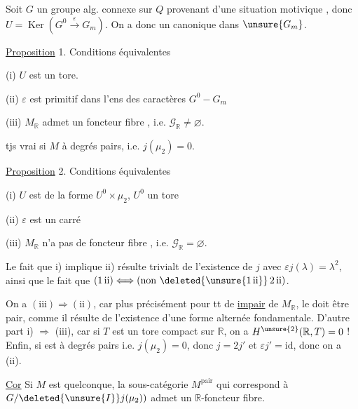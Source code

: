 Soit $G$ un groupe  alg. connexe sur $Q$ provenant d'une situation motivique , donc $U=\operatorname{Ker}(G^0\xrightarrow{\varepsilon}G_m)$. On a donc un  canonique dans $\unsure{G_m}$.


\uline{Proposition} 1. Conditions équivalentes

(i) $U$ est un tore.

(ii) $\varepsilon$ est primitif dans l'ens des caractères $G^0\mathbin{-}G_m$

(iii) $M_{\mathbb R}$ admet un foncteur fibre , i.e. $\mathscr G_{\mathbb R}\ne\varnothing$.

 tjs vrai si $M$ à degrés pairs, i.e. $j(\mu_2)=0$.

\uline{Proposition} 2. Conditions équivalentes

(i) $U$ est de la forme $U^0\times\mu_2$, $U^0$ un tore

(ii) $\varepsilon$ est  un carré 

(iii) $M_{\mathbb R}$ n'a pas de foncteur fibre , i.e. $\mathscr G_{\mathbb R}=\varnothing$.

Le fait que i) implique ii)  résulte trivialt de  l'existence de $j$ avec $\varepsilon j(\lambda)=\lambda^2$, ainsi que le fait que $(1\,\mathrm{ii})\Longleftrightarrow(\text{non }\deleted{\unsure{1\,\mathrm{ii}}}\,2\,\mathrm{ii})$.

On a $(\mathrm{iii})\Rightarrow(\mathrm{ii})$, car plus précisément pour tt   de    \uline{impair} de $M_{\mathbb R}$, le   doit être pair, comme il résulte de l'existence d'une forme alternée fondamentale. D'autre part i) $\Rightarrow$ (iii), car si $T$ est un tore compact sur $\mathbb R$, on a $H^{\unsure{2}}(\mathbb R,T)=0$ ! Enfin, si   est à degrés pairs i.e. $j(\mu_2)=0$, donc $j=2j'$ et $\varepsilon j'=\mathrm{id}$, donc on a (ii).

\uline{Cor} Si $M$ est quelconque, la sous-catégorie  $M^{\text{pair}}$   qui correspond à $G/\deleted{\unsure{I}}j(\mu_2))$  admet un $\mathbb R$-foncteur fibre.
